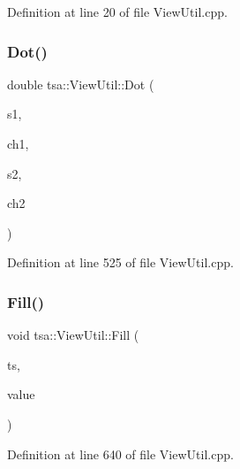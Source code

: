 Definition at line 20 of file View\+Util.\+cpp.

\mbox{\label{classtsa_1_1_view_util_a828f66a78c3084e7e0a56b7e05e3b0fc}} 
\subsubsection{\texorpdfstring{Dot()}{Dot()}}
{\footnotesize\ttfamily double tsa\+::\+View\+Util\+::\+Dot (\begin{DoxyParamCaption}\item[{\hyperlink{namespacetsa_ac599574bcc094eda25613724b8f3ca9e}{Seq\+View\+Double} \&}]{s1,  }\item[{unsigned int}]{ch1,  }\item[{\hyperlink{namespacetsa_ac599574bcc094eda25613724b8f3ca9e}{Seq\+View\+Double} \&}]{s2,  }\item[{unsigned int}]{ch2 }\end{DoxyParamCaption})\hspace{0.3cm}{\ttfamily [static]}}



Definition at line 525 of file View\+Util.\+cpp.

\mbox{\label{classtsa_1_1_view_util_a82cc2f70f00bab7f0a9a39de47f24ce5}} 
\subsubsection{\texorpdfstring{Fill()}{Fill()}}
{\footnotesize\ttfamily void tsa\+::\+View\+Util\+::\+Fill (\begin{DoxyParamCaption}\item[{\hyperlink{namespacetsa_ac599574bcc094eda25613724b8f3ca9e}{Seq\+View\+Double} \&}]{ts,  }\item[{double}]{value }\end{DoxyParamCaption})\hspace{0.3cm}{\ttfamily [static]}}



Definition at line 640 of file View\+Util.\+cpp.

\mbox{\label{classtsa_1_1_view_util_a7f0e2c3c9c8acbfc6f6e04182f6b126c}} 
